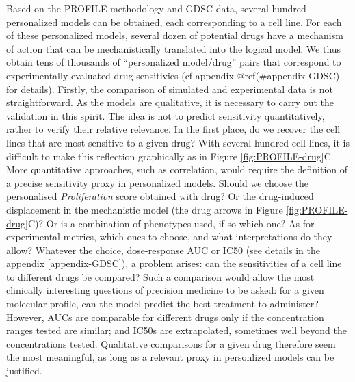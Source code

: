 \documentclass[a4paper,12pt,twoside,onecolumn,openright,final,oldfontcommands]{memoir}
\begin{document}
Based on the PROFILE methodology and GDSC data, several hundred
personalized models can be obtained, each corresponding to a cell line.
For each of these personalized models, several dozen of potential drugs
have a mechanism of action that can be mechanistically translated into
the logical model. We thus obtain tens of thousands of ``personalized
model/drug'' pairs that correspond to experimentally evaluated drug
sensitivies (cf appendix @ref(\#appendix-GDSC) for details). Firstly,
the comparison of simulated and experimental data is not
straightforward. As the models are qualitative, it is necessary to carry
out the validation in this spirit. The idea is not to predict
sensitivity quantitatively, rather to verify their relative relevance.
In the first place, do we recover the cell lines that are most sensitive
to a given drug? With several hundred cell lines, it is difficult to
make this reflection graphically as in Figure \ref{fig:PROFILE-drug}C.
More quantitative approaches, such as correlation, would require the
definition of a precise sensitivity proxy in personalized models. Should
we choose the personalised \emph{Proliferation} score obtained with
drug? Or the drug-induced displacement in the mechanistic model (the
drug arrows in Figure \ref{fig:PROFILE-drug}C)? Or is a combination of
phenotypes used, if so which one? As for experimental metrics, which
ones to choose, and what interpretations do they allow? Whatever the
choice, dose-response AUC or IC50 (see details in the appendix
\ref{appendix-GDSC}), a problem arises: can the sensitivities of a cell
line to different drugs be compared? Such a comparison would allow the
most clinically interesting questions of precision medicine to be asked:
for a given molecular profile, can the model predict the best treatment
to administer? However, AUCs are comparable for different drugs only if
the concentration ranges tested are similar; and IC50s are extrapolated,
sometimes well beyond the concentrations tested. Qualitative comparisons
for a given drug therefore seem the most meaningful, as long as a
relevant proxy in personlized models can be justified.
\end{document}
